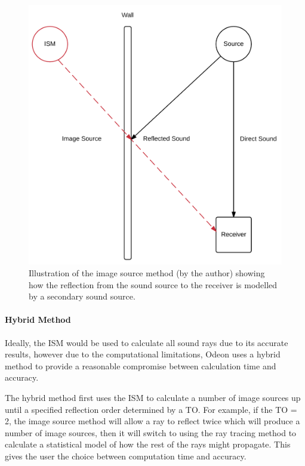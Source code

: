 \documentclass[../../main.tex]{subfiles}
\begin{document}
			\begin{figure}[ht]
				\center\includegraphics[scale = 0.3]{Sections/Background/images/ISM.png}
				\caption{Illustration of the image source method (by the author) showing how the reflection from the sound source to the receiver is modelled by a secondary sound source.}
				\label{ISMPic}
			\end{figure}

		\paragraph{Hybrid Method}

			Ideally, the \ac{ISM} would be used to calculate all sound rays due to its accurate results, however due to the computational limitations, Odeon uses a hybrid method to provide a reasonable compromise between calculation time and accuracy.

			The hybrid method first uses the \ac{ISM} to calculate a number of image sources up until a specified reflection order determined by a \ac{TO}. For example, if the \ac{TO} = 2, the image source method will allow a ray to reflect twice which will produce a number of image sources, then it will switch to using the ray tracing method to calculate a statistical model of how the rest of the rays might propagate. This gives the user the choice between computation time and accuracy.
\end{document}
